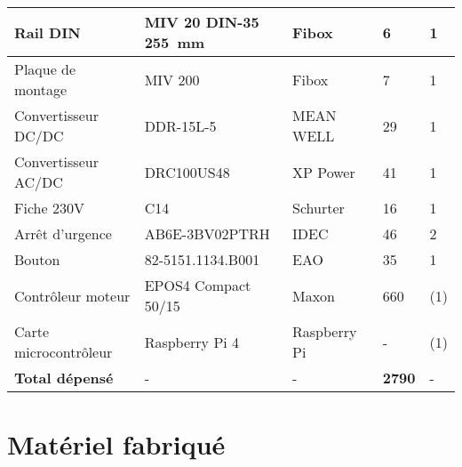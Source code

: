 \begin{table}[H]
{\begin{tabular}{|l|l|l|l|l|}
            Rail DIN               & MIV 20 DIN-35 255~mm             & Fibox \cite{Fibox}              & 6                          & 1                 \\ \hline
            Plaque de montage      & MIV 200                          & Fibox \cite{Fibox}              & 7                          & 1                 \\ \hline
            Convertisseur DC/DC    & DDR-15L-5                        & MEAN WELL \cite{MEANWELL}       & 29                         & 1                 \\ \hline
            Convertisseur AC/DC    & DRC100US48                       & XP Power \cite{XPPower}         & 41                         & 1                 \\ \hline
            Fiche 230V             & C14                              & Schurter \cite{Schurter}        & 16                         & 1                 \\ \hline
            Arrêt d'urgence        & AB6E-3BV02PTRH                   & IDEC \cite{IDEC}                & 46                         & 2                 \\ \hline
            Bouton                 & 82-5151.1134.B001                & EAO \cite{EAO}                  & 35                         & 1                 \\ \hline
            Contrôleur moteur      & EPOS4 Compact 50/15              & Maxon \cite{Maxon}              & 660                        & (1)               \\ \hline
            Carte microcontrôleur  & Raspberry Pi 4                   & Raspberry Pi \cite{RaspberryPi} & -                          & (1)               \\ \hline
            \textbf{Total dépensé} & -                                & -                               & \textbf{2790}\footnotemark & -                 \\ \hline
        \end{tabular}%
    }
\end{table}


\section{Matériel fabriqué}\label{sec:MatFab}

